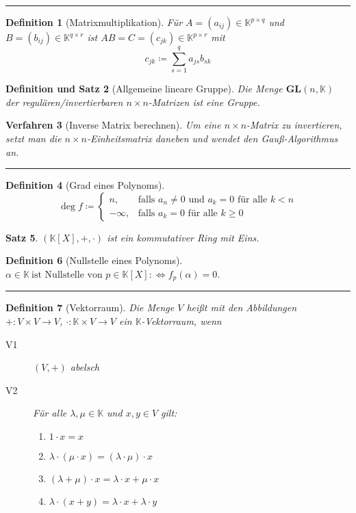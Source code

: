 \documentclass[a4paper]{article}
\newcounter{Sec}
\theoremstyle{marginbreak}
\newtheorem{definition}{Definition}[Sec]
\newtheorem{satz}[definition]{Satz}
\newtheorem{defsatz}[definition]{Definition und Satz}
\newtheorem{verfahren}[definition]{Verfahren}
\newcommand{\sep}{%
	\rule{\textwidth}{0.3pt}%
	\stepcounter{Sec}%
	}
\begin{document}
	\sep
	\begin{definition}[Matrixmultiplikation]
		Für $A = (a_{ij}) \in \mathbb{K}^{p\times q}$ und $B = (b_{ij}) \in \mathbb{K}^{q\times r}$
		ist $AB = C = (c_{jk}) \in \mathbb{K}^{p\times r}$ mit
		\[ c_{jk} \coloneqq \sum_{s = 1}^q a_{js}b_{sk}\]
	\end{definition}
	\begin{defsatz}[Allgemeine lineare Gruppe]
		Die Menge $\mathbf{GL}(n, \mathbb{K})$ der regulären/invertierbaren $n\times n$-Matrizen ist eine Gruppe.
	\end{defsatz}
	\begin{verfahren}[Inverse Matrix berechnen]
		Um eine $n\times n$-Matrix zu invertieren, setzt man die $n\times n$-Einheitsmatrix daneben und wendet
		den Gauß-Algorithmus an.
	\end{verfahren}
	\sep
	\begin{definition}[Grad eines Polynoms]
		\[\deg f\coloneqq\begin{cases}
			n, &\text{falls $a_n \neq 0$ und $a_k = 0$ für alle $k < n$}\\
			-\infty,  &\text{falls $a_k = 0$ für alle $k \geq 0$}
		\end{cases}\]
	\end{definition}
	\begin{satz}
		$(\mathbb{K}[X], +, \cdot)$ ist ein kommutativer Ring mit Eins.
	\end{satz}
	\begin{definition}[Nullstelle eines Polynoms]
		$\alpha\in\mathbb{K}~\text{ist Nullstelle von $p\in\mathbb{K}[X]$} :\Longleftrightarrow f_p(\alpha) = 0$.
	\end{definition}
	\sep
	\begin{definition}[Vektorraum]
		Die Menge $V$ heißt mit den Abbildungen $+\colon V\times V\to V$, $\cdot\colon\mathbb{K}\times V\to V$ ein $\mathbb{K}$-Vektorraum, wenn
		\begin{description}
			\item[V1] $(V, +)$ abelsch
			\item[V2] Für alle $\lambda,\mu\in\mathbb{K}$ und $x, y\in V$ gilt:
				\begin{enumerate}[label=(\alph*)]
					\item $1 \cdot x = x$
					\item $\lambda \cdot (\mu \cdot x) = (\lambda \cdot \mu) \cdot x$
					\item $(\lambda + \mu) \cdot x = \lambda \cdot x + \mu \cdot x$
					\item $\lambda \cdot (x + y) = \lambda \cdot x + \lambda \cdot y$
				\end{enumerate}
		\end{description}
	\end{definition}
\end{document}
